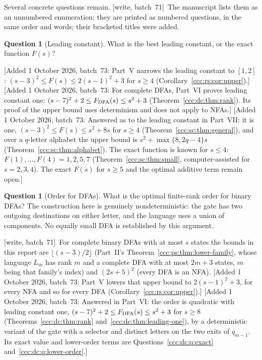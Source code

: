 \documentclass[11pt,letterpaper]{article}
\theoremstyle{definition}
\newtheorem{question}[theorem]{Question}
\theoremstyle{remark}
\newcommand{\wsevone}{\textup{[write, batch~71]}}
\newcommand{\waddsevthree}[1]{\textup{[}Added 1 October 2026, batch~73: #1\textup{]}}
\begin{document}
Several concrete questions remain.
\wsevone\ The manuscript lists them as an unnumbered enumeration; they are
printed as numbered questions, in the same order and words; their bracketed
titles were added.

\begin{question}[Leading constant]\label{ccc:qr:q:constant}
What is the best leading constant, or the exact function $F(s)$?
\end{question}
\waddsevthree{Part~V narrows the leading constant to $[1,2]$:
$(s-3)^2\le F(s)\le2(s-1)^2+3$ for $s\ge4$
(Corollary~\ref{ccc:rs:cor:upper}).}
\waddsevthree{For complete DFAs, Part~VI proves leading constant one:
$(s-7)^2+2\le F_{\rm DFA}(s)\le s^2+3$ (Theorem~\ref{ccc:dc:thm:rank}). Its
proof of the upper bound uses determinism and does not apply to NFAs.}
\waddsevthree{Answered as to the leading constant in Part~VII: it is one,
$(s-3)^2\le F(s)\le s^2+8s$ for $s\ge4$
(Theorem~\ref{ccc:sc:thm:general}), and over a $q$-letter alphabet the upper
bound is $s^2+\max\{8,2q-4\}s$ (Theorem~\ref{ccc:sc:thm:alphabet}). The exact
function is known for $s\le4$: $F(1),\ldots,F(4)=1,2,5,7$
(Theorem~\ref{ccc:sc:thm:small}, computer-assisted for $s=2,3,4$). The exact
$F(s)$ for $s\ge5$ and the optimal additive term remain open.}

\begin{question}[Order for DFAs]\label{ccc:qr:q:dfa}
What is the optimal finite-rank order for binary DFAs? The construction here
is genuinely nondeterministic: the gate has two outgoing destinations on
either letter, and the language uses a union of components. No equally small
DFA is established by this argument.
\end{question}
\wsevone\ For complete binary DFAs with at most $s$ states the bounds in this
report are $\lfloor(s-3)/2\rfloor$ (Part~II's
Theorem~\ref{ccc:ps:thm:lower-family}, whose language $L_m$ has rank $m$ and
a complete DFA with at most $2m+3$ states, $m$ being that family's index)
and $(2s+5)^2$ (every DFA is an NFA).
\waddsevthree{Part~V lowers that upper bound to $2(s-1)^2+3$, for every NFA
and so for every DFA (Corollary~\ref{ccc:rs:cor:upper}).}
\waddsevthree{Answered in Part~VI: the order is quadratic with leading
constant one, $(s-7)^2+2\le F_{\rm DFA}(s)\le s^2+3$ for $s\ge8$
(Theorems~\ref{ccc:dc:thm:rank} and~\ref{ccc:dc:thm:leading-one}), by a
deterministic variant of the gate with a selector and distinct letters on
the two exits of $q_{m-1}$. Its exact value and lower-order terms are
Questions~\ref{ccc:dc:q:exact} and~\ref{ccc:dc:q:lower-order}.}
\end{document}
